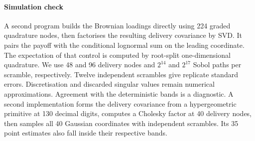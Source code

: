 \documentclass[11pt]{article}
\begin{document}
\paragraph{Simulation check}
A second program builds the Brownian loadings directly using 224 graded quadrature nodes,
then factorises the resulting delivery covariance by SVD. It pairs the payoff with the
conditional lognormal sum on the leading coordinate. The expectation of that control is
computed by root-split one-dimensional quadrature. We use 48 and 96 delivery nodes and
$2^{14}$ and $2^{17}$ Sobol paths per scramble, respectively. Twelve independent scrambles
give replicate standard errors. Discretisation and discarded singular values remain
numerical approximations. Agreement with the deterministic bands is a diagnostic. A second implementation forms the delivery covariance from a hypergeometric primitive at 130 decimal digits, computes a Cholesky factor at 40 delivery nodes, then samples all 40 Gaussian coordinates with independent scrambles. Its 35 point estimates also fall inside their respective bands.

{\small
\setlength{\bibsep}{3pt}


}
\end{document}
